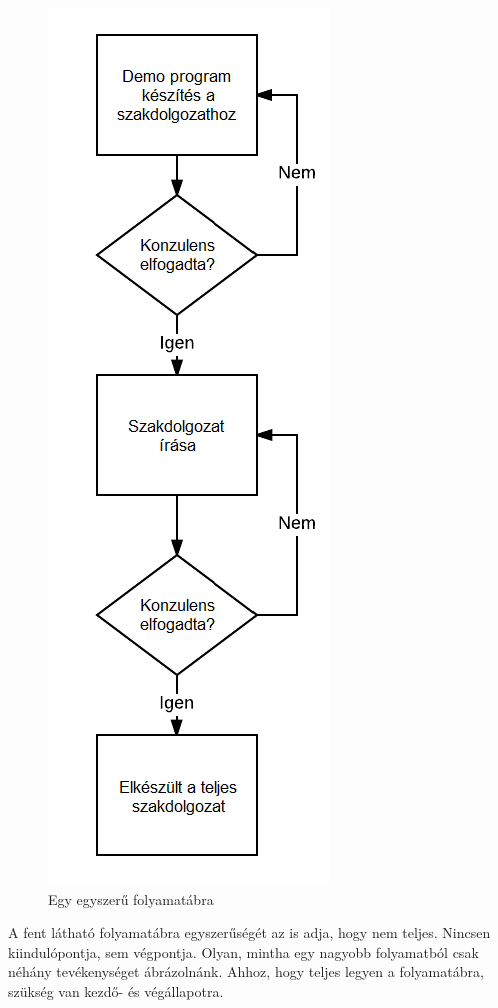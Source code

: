 \begin{figure}[h]
\centering
\includegraphics[scale=0.7]{images/folyamatabra.png}
\caption{Egy egyszerű folyamatábra}
\label{fig:folyamata}
\end{figure}

\newpage

A fent látható folyamatábra egyszerűségét az is adja, hogy nem teljes. Nincsen kiindulópontja, sem végpontja. Olyan, mintha egy nagyobb folyamatból csak néhány tevékenységet ábrázolnánk. Ahhoz, hogy teljes legyen a folyamatábra, szükség van kezdő- és végállapotra.

